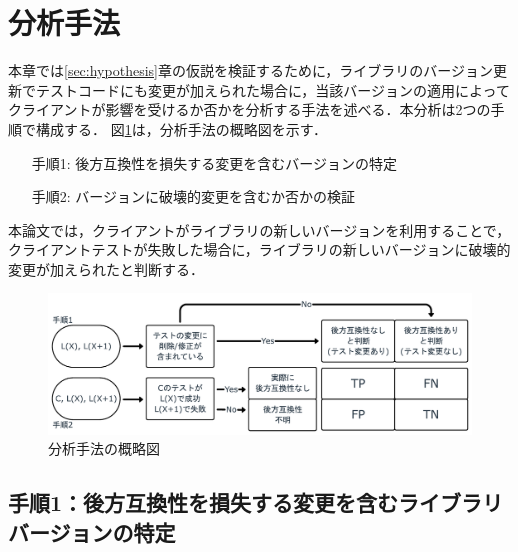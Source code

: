 \documentclass[submit]{ipsj}
\begin{document}
\section{分析手法}
\label{sec:analyticalMethod}

本章では\ref{sec:hypothesis}章の仮説を検証するために，ライブラリのバージョン更新でテストコードにも変更が加えられた場合に，当該バージョンの適用によってクライアントが影響を受けるか否かを分析する手法を述べる．本分析は2つの手順で構成する．
図\ref{fig:overview}は，分析手法の概略図を示す．

\begin{enumerate}
\item[手順1: ] 後方互換性を損失する変更を含むバージョンの特定
\item[手順2: ] バージョンに破壊的変更を含むか否かの検証
\end{enumerate}

本論文では，クライアントがライブラリの新しいバージョンを利用することで，クライアントテストが失敗した場合に，ライブラリの新しいバージョンに破壊的変更が加えられたと判断する．

\begin{figure}[t]
  \centering
  \includegraphics[width=0.95\linewidth]{IPSJjournal_maekawa_fig/overview.pdf}
  \caption{分析手法の概略図}
  \label{fig:overview}
\end{figure}

\subsection{手順1：後方互換性を損失する変更を含むライブラリバージョンの特定}
\label{sec:step1}
\end{document}
